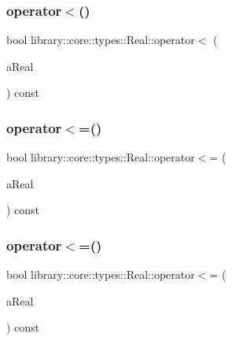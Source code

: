 \mbox{\label{classlibrary_1_1core_1_1types_1_1_real_af77c7841e4b32ec1839d39f31728351e}} 
\subsubsection{\texorpdfstring{operator$<$()}{operator<()}\hspace{0.1cm}{\footnotesize\ttfamily [2/2]}}
{\footnotesize\ttfamily bool library\+::core\+::types\+::\+Real\+::operator$<$ (\begin{DoxyParamCaption}\item[{const \hyperlink{classlibrary_1_1core_1_1types_1_1_real_a9c5c8826b7e5a8e39544d23fea6c0e1c}{Real\+::\+Value\+Type} \&}]{a\+Real }\end{DoxyParamCaption}) const}

\mbox{\label{classlibrary_1_1core_1_1types_1_1_real_af2b4d3909f7031f36908b10900b7bea7}} 
\subsubsection{\texorpdfstring{operator$<$=()}{operator<=()}\hspace{0.1cm}{\footnotesize\ttfamily [1/2]}}
{\footnotesize\ttfamily bool library\+::core\+::types\+::\+Real\+::operator$<$= (\begin{DoxyParamCaption}\item[{const \hyperlink{classlibrary_1_1core_1_1types_1_1_real}{Real} \&}]{a\+Real }\end{DoxyParamCaption}) const}

\mbox{\label{classlibrary_1_1core_1_1types_1_1_real_a75c87f91825d9d84cb1c44888bf33a38}} 
\subsubsection{\texorpdfstring{operator$<$=()}{operator<=()}\hspace{0.1cm}{\footnotesize\ttfamily [2/2]}}
{\footnotesize\ttfamily bool library\+::core\+::types\+::\+Real\+::operator$<$= (\begin{DoxyParamCaption}\item[{const \hyperlink{classlibrary_1_1core_1_1types_1_1_real_a9c5c8826b7e5a8e39544d23fea6c0e1c}{Real\+::\+Value\+Type} \&}]{a\+Real }\end{DoxyParamCaption}) const}

